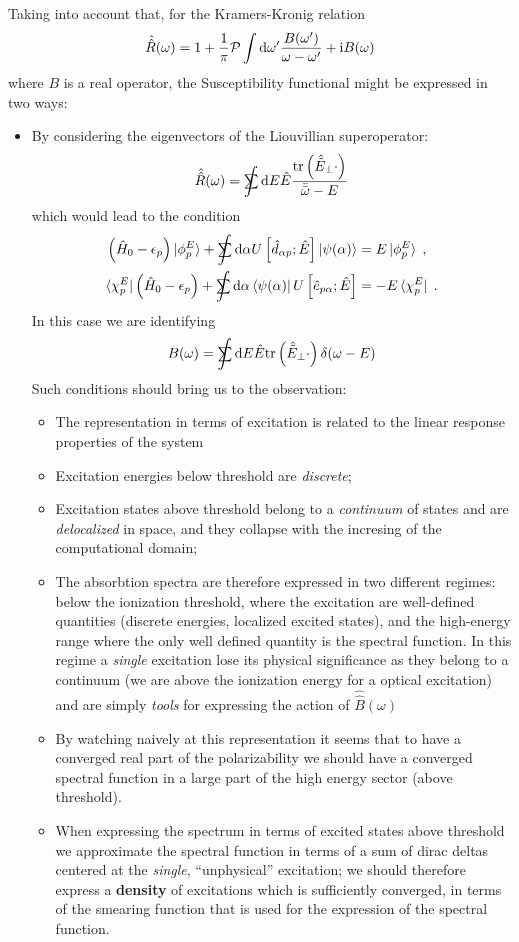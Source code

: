 \documentclass[a4paper]{article}
\newcommand{\dd}{{\rm d}}
\newcommand{\eps}{\epsilon}
\newcommand{\bomega}{\bar\omega}
\newcommand{\bbomega}{\bar{\bomega}}
\newcommand{\ii}{\mathrm{i}}
\newcommand{\sint}{\mathrlap{\displaystyle\int}
\mathrlap{\textstyle\sum}
\phantom{\mathrlap{\displaystyle
\int}\textstyle\sum}}
\newcommand{\be}{\begin{equation}}
\newcommand{\ee}{\end{equation}}
\newcommand{\nn}{\notag}
\newcommand{\op}[1]{\hat {#1}}
\newcommand{\sop}[1]{\op{\op {#1}}}
\newcommand{\trace}[1]{\mathrm{tr}\left(#1\right)}
\newcommand{\hnot}{\op{H}_0}
\newcommand{\excite}[2]{\op e_{{#1}{#2}}}
\newcommand{\decay}[2]{\op d_{{#1}{#2}}}
\begin{document}
Taking into account that, for the Kramers-Kronig relation
\be
\sop R(\omega)=1+ \frac{1}{\pi}\mathcal P \int \dd \omega' \frac{B(\omega')}{\omega -\omega'} + \ii B(\omega)
\ee
where $B$ is a real operator, the Susceptibility functional might be expressed in two ways:
\begin{itemize}
\item By considering the eigenvectors of the Liouvillian superoperator:
\be
\sop R(\omega) = \sint \dd E \op E \frac{\trace{\op{\tilde E}_\perp \cdot }}{\bbomega -E}
\ee
which would lead to the condition
\begin{align}
\left(\hnot-\eps_p\right)\ket{\phi^E_p} +\sint \dd\alpha  U\left[\decay{\alpha}{p}; \op E\right] \ket{\psi(\alpha)} &= E\ket{\phi^E_p} \;,\nn \\
\bra{\chi^E_p}\left(\hnot-\eps_p\right) +\sint \dd\alpha \bra{\psi(\alpha)} U\left[\excite{p}{\alpha}; \op E\right] &= -E\bra{\chi^E_p} \;.
\end{align}
In this case we are identifying 
\be
B(\omega) = \sint \dd E \op E \trace{\op{\tilde E}_\perp \cdot } \delta(\omega - E)
\ee
Such conditions should bring us to the observation:
\begin{itemize}
\item The representation in terms of excitation is related to the linear response properties of the 
system
\item Excitation energies below threshold are \emph{discrete};
\item Excitation states above threshold belong to a \emph{continuum} of states and are \emph{delocalized} in space, and they collapse with the incresing of the computational domain;
\item The absorbtion spectra are therefore expressed in two different regimes: below the ionization threshold, where the excitation are well-defined quantities (discrete energies, localized excited states), and the high-energy range where the only well defined quantity is the spectral function.
In this regime a \emph{single} excitation lose its physical significance as they belong to a continuum (we are above the ionization energy for a optical excitation)  and are simply \emph{tools} 
for expressing the action of $\sop B(\omega)$
\item By watching naively at this representation it seems that to have a converged real part of the polarizability we should have a converged spectral function in a large part of the high energy sector (above threshold). 
\item When expressing the spectrum in terms of excited states above threshold we approximate the spectral function in terms of a sum of dirac deltas centered at the \emph{single}, ``unphysical'' excitation; we should therefore express a \textbf{density} of excitations which is sufficiently converged, in terms of the smearing function that is used for the expression of the spectral function.

\end{itemize}
\end{itemize}
\end{document}
